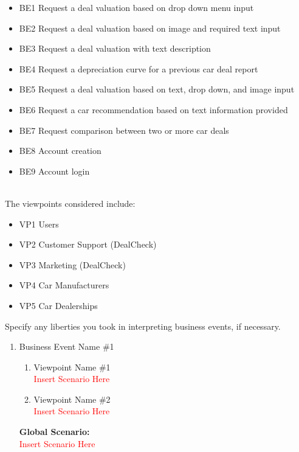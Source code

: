 \documentclass[]{article}
\begin{document}
\begin{enumerate}
\begin{itemize}
	\item BE1 Request a deal valuation based on drop down menu input
	\item BE2 Request a deal valuation based on image and required text input
	\item BE3 Request a deal valuation with text description
	\item BE4 Request a depreciation curve for a previous car deal report
	\item BE5 Request a deal valuation based on text, drop down, and image input
	\item BE6 Request a car recommendation based on text information provided
	\item BE7 Request comparison between two or more car deals
	\item BE8 Account creation
	\item BE9 Account login
\end{itemize}

 \\

\noindent The viewpoints considered include:

\begin{itemize}
	\item VP1 Users
	\item VP2 Customer Support (DealCheck)
	\item VP3 Marketing (DealCheck)
	\item VP4 Car Manufacturers
	\item VP5 Car Dealerships
\end{itemize}

 Specify any liberties you took in interpreting business events, if necessary. \\

\begin{enumerate}[{\bf {BE}1.}]

	\item Business Event Name \#1
		\begin{enumerate}[{\bf VP1.}]
			\item Viewpoint Name \#1 \\
				\textcolor{red}{Insert Scenario Here}
			\item Viewpoint Name \#2 \\
				\textcolor{red}{Insert Scenario Here}
		\end{enumerate}
		{\bf Global Scenario:}\\
		\textcolor{red}{Insert Scenario Here}


\end{enumerate}
\end{enumerate}
\end{document}
